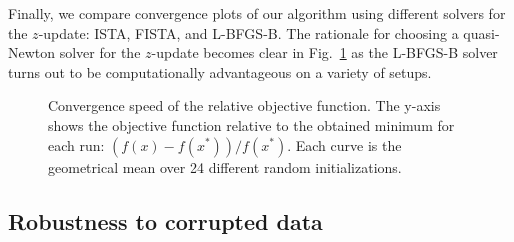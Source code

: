 Finally, we compare convergence plots of our algorithm using different solvers for the $z$-update: ISTA, FISTA, and L-BFGS-B. The rationale for choosing a quasi-Newton solver for the $z$-update becomes clear in  Fig.~\ref{fig:convergence_z_update} as the L-BFGS-B solver turns out to be computationally advantageous on a variety of setups.

\begin{figure}[h]
    \centering
    \caption[Comparison of solvers for the activations subproblem.]{Convergence speed of the relative objective function. The y-axis shows the objective function relative to the obtained minimum for each run: $(f(x) - f(x^*))/f(x^*)$. Each curve is the geometrical mean over 24 different random initializations.}
    \label{fig:convergence_z_update}
\end{figure}

\subsection{Robustness to corrupted data} 

